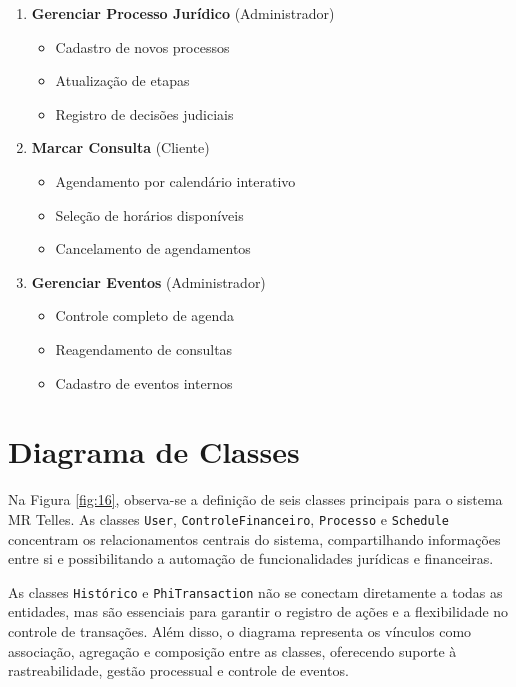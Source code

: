 \begin{enumerate}[leftmargin=*]
    \item \textbf{Gerenciar Processo Jurídico} (Administrador)
    \begin{itemize}
        \item Cadastro de novos processos
        \item Atualização de etapas
        \item Registro de decisões judiciais
    \end{itemize}
    
    \item \textbf{Marcar Consulta} (Cliente)
    \begin{itemize}
        \item Agendamento por calendário interativo
        \item Seleção de horários disponíveis
        \item Cancelamento de agendamentos
    \end{itemize}
    
    \item \textbf{Gerenciar Eventos} (Administrador)
    \begin{itemize}
        \item Controle completo de agenda
        \item Reagendamento de consultas
        \item Cadastro de eventos internos
    \end{itemize}
\end{enumerate}


\newpage
\section{Diagrama de Classes}\label{sec:diagrama-classes}

Na Figura \ref{fig:16}, observa-se a definição de seis classes principais para o sistema MR Telles. As classes \texttt{User}, \texttt{ControleFinanceiro}, \texttt{Processo} e \texttt{Schedule} concentram os relacionamentos centrais do sistema, compartilhando informações entre si e possibilitando a automação de funcionalidades jurídicas e financeiras.

As classes \texttt{Histórico} e \texttt{PhiTransaction} não se conectam diretamente a todas as entidades, mas são essenciais para garantir o registro de ações e a flexibilidade no controle de transações. Além disso, o diagrama representa os vínculos como associação, agregação e composição entre as classes, oferecendo suporte à rastreabilidade, gestão processual e controle de eventos.


